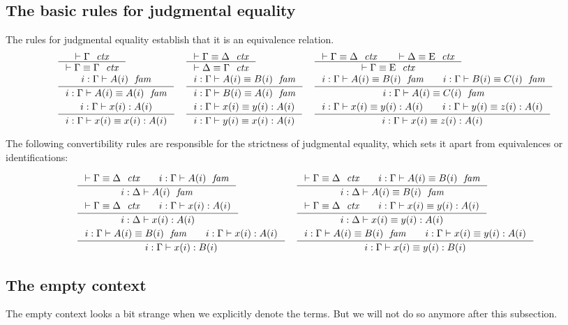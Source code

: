 \subsection{The basic rules for judgmental equality}
The rules for judgmental equality establish that it is an equivalence relation.
\bgroup\small
\begin{align*}
& \inference{\jvctx{\Gamma}}{\jvctxeq{\Gamma}{\Gamma}} 
& & \inference{\jvctxeq{\Gamma}{\Delta}}{\jvctxeq{\Delta}{\Gamma}} 
& & \inference{\jvctxeq{\Gamma}{\Delta}\qquad\jvctxeq{\Delta}{\greek{E}}}{\jvctxeq{\Gamma}{\greek{E}}}\\
& \inference{\jvfam{i}{\Gamma}{A}}{\jvfameq{i}{\Gamma}{A}{A}} 
& & \inference{\jvfameq{i}{\Gamma}{A}{B}}{\jvfameq{i}{\Gamma}{B}{A}}
& & \inference{\jvfameq{i}{\Gamma}{A}{B}\qquad\jvfameq{i}{\Gamma}{B}{C}}{\jvfameq{i}{\Gamma}{A}{C}}\\
& \inference{\jvterm{i}{\Gamma}{A}{x}}{\jvtermeq{i}{\Gamma}{A}{x}{x}}
& & \inference{\jvtermeq{i}{\Gamma}{A}{x}{y}}{\jvtermeq{i}{\Gamma}{A}{y}{x}}
& & \inference{\jvtermeq{i}{\Gamma}{A}{x}{y}\qquad\jvtermeq{i}{\Gamma}{A}{y}{z}}{\jvtermeq{i}{\Gamma}{A}{x}{z}}
\end{align*}
\egroup

The following convertibility rules are responsible for the strictness
of judgmental equality, which sets it apart from equivalences or identifications:

\begin{align*}
& \inference{\jvctxeq{\Gamma}{\Delta}\qquad\jvfam{i}{\Gamma}{A}}{\jvfam{i}{\Delta}{A}}
& & \inference{\jvctxeq{\Gamma}{\Delta}\qquad\jvfameq{i}{\Gamma}{A}{B}}{\jvfameq{i}{\Delta}{A}{B}}\\
& \inference{\jvctxeq{\Gamma}{\Delta}\qquad\jvterm{i}{\Gamma}{A}{x}}{\jvterm{i}{\Delta}{A}{x}}
& & \inference{\jvctxeq{\Gamma}{\Delta}\qquad\jvtermeq{i}{\Gamma}{A}{x}{y}}{\jvtermeq{i}{\Delta}{A}{x}{y}}\\
& \inference{\jvfameq{i}{\Gamma}{A}{B}\qquad \jvterm{i}{\Gamma}{A}{x}}{\jvterm{i}{\Gamma}{B}{x}}
& & \inference{\jvfameq{i}{\Gamma}{A}{B}\qquad\jvtermeq{i}{\Gamma}{A}{x}{y}}{\jvtermeq{i}{\Gamma}{B}{x}{y}}
\end{align*}

\subsection{The empty context}
The empty context looks a bit strange when we explicitly denote the terms. But
we will not do so anymore after this subsection.

